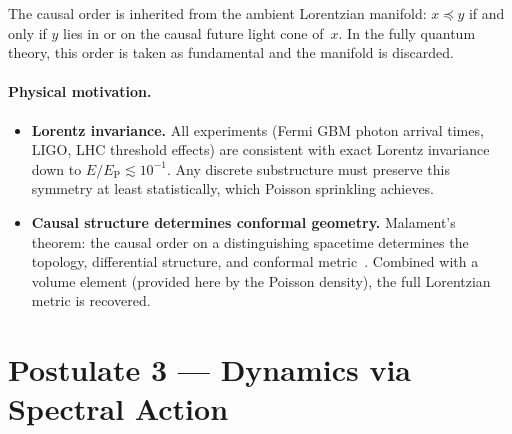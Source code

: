 \documentclass[12pt,a4paper]{article}
\theoremstyle{postulate}
\newcommand{\Eplanck}{E_{\mathrm{P}}}
\begin{document}
The causal order is inherited from the ambient Lorentzian manifold:
$x \preceq y$ if and only if $y$ lies in or on the causal future light cone
of~$x$.  In the fully quantum theory, this order is taken as fundamental and
the manifold is discarded.

\paragraph{Physical motivation.}
\begin{itemize}
  \item \textbf{Lorentz invariance.}\quad
        All experiments (Fermi GBM photon arrival times, LIGO, LHC threshold
        effects) are consistent with exact Lorentz invariance down to
        $E/\Eplanck \lesssim 10^{-1}$.  Any discrete substructure must
        preserve this symmetry at least statistically, which Poisson
        sprinkling achieves.
  \item \textbf{Causal structure determines conformal geometry.}\quad
        Malament's theorem: the causal order on a distinguishing spacetime
        determines the topology, differential structure, and conformal
        metric~\cite{Malament1977}.  Combined with a volume element (provided
        here by the Poisson density), the full Lorentzian metric is recovered.
\end{itemize}


\section{Postulate 3 --- Dynamics via Spectral Action}\label{sec:P3}
\end{document}
